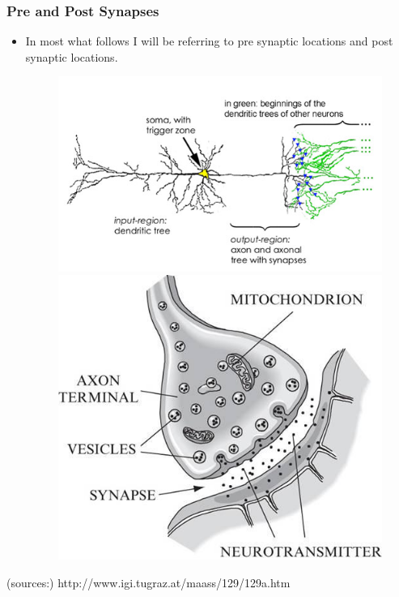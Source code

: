 \documentclass{beamer}
\begin{document}
\begin{frame}
\frametitle{Pre and Post Synapses}%
\begin{itemize}

\vfill\item In most what follows I will be referring to pre synaptic locations and post synaptic locations.
\vfill

\begin{figure}
\centering
\begin{minipage}{.45\textwidth}
\centering
\includegraphics[scale=1.3]{ios.jpg}
\end{minipage}\hfill\hfill\hfill
\begin{minipage}{.45\textwidth}
\centering
\includegraphics[scale=0.35]{anatomy2}

\end{minipage}
\vfill
\end{figure}

\end{itemize}
\vfill
\fontsize{6pt}{6pt}\selectfont 
(sources:)
http://www.igi.tugraz.at/maass/129/129a.htm

\end{frame}
\end{document}
